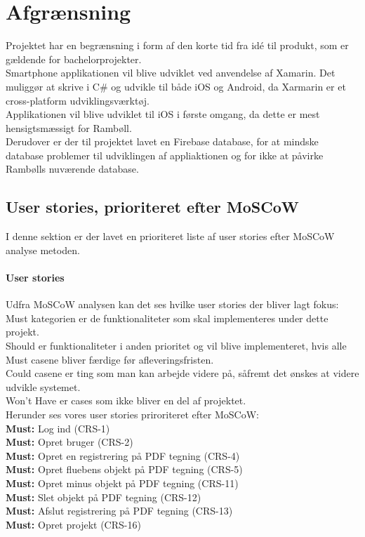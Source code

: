 \chapter{Afgrænsning} \label{sec:Afgraensning}
Projektet har en begrænsning i form af den korte tid fra idé til produkt, som er gældende for bachelorprojekter.\\
Smartphone applikationen vil blive udviklet ved anvendelse af Xamarin. Det muliggør at skrive i C\# og udvikle til både iOS og Android, da Xarmarin er et cross-platform udviklingsværktøj. \\
Applikationen vil blive udviklet til iOS i første omgang, da dette er mest hensigtsmæssigt for Rambøll. \\
Derudover er der til projektet lavet en Firebase database, for at mindske database problemer til udviklingen af appliaktionen og for ikke at påvirke Rambølls nuværende database. \\

\section{User stories, prioriteret efter MoSCoW} \label{sec:MoSCoW}
I denne sektion er der lavet en prioriteret liste af user stories efter MoSCoW analyse metoden\cite{MoSCoW}.

\subsubsection{User stories}
Udfra MoSCoW analysen kan det ses hvilke user stories der bliver lagt fokus: \\
Must kategorien er de funktionaliteter som skal implementeres under dette projekt.\\ 
Should er funktionaliteter i anden prioritet og vil blive implementeret, hvis alle Must casene bliver færdige før afleveringsfristen.\\ 
Could casene er ting som man kan arbejde videre på, såfremt det ønskes at videre udvikle systemet. \\
Won't Have er cases som ikke bliver en del af projektet.\\

Herunder ses vores user stories priroriteret efter MoSCoW: \\
\textbf{Must:} Log ind (CRS-1) \\
\textbf{Must:} Opret bruger (CRS-2) \\
\textbf{Must:} Opret en registrering på PDF tegning (CRS-4) \\
\textbf{Must:} Opret fluebens objekt på PDF tegning (CRS-5) \\
\textbf{Must:} Opret minus objekt på PDF tegning (CRS-11) \\
\textbf{Must:} Slet objekt på PDF tegning (CRS-12) \\
\textbf{Must:} Afslut registrering på PDF tegning (CRS-13) \\
\textbf{Must:} Opret projekt (CRS-16) \\ \\

